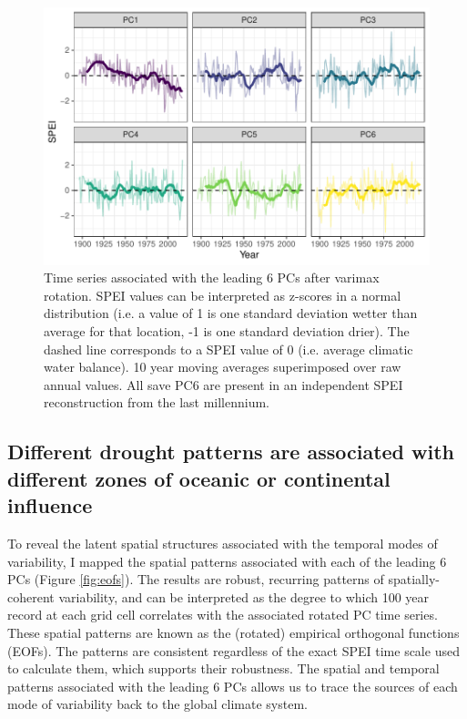 \documentclass[10pt]{iopart}
\begin{document}
\begin{figure}[!ht]
\centering
\includegraphics[width=.7\linewidth]{figures/pc_obs.pdf}
\caption{Time series associated with the leading 6 PCs after varimax rotation. SPEI values can be interpreted as z-scores in a normal distribution (i.e. a value of 1 is one standard deviation wetter than average for that location, -1 is one standard deviation drier). The dashed line corresponds to a SPEI value of 0 (i.e. average climatic water balance). 10 year moving averages superimposed over raw annual values. All save PC6 are present in an independent SPEI reconstruction from the last millennium.}
\label{fig:pc-obs}
\end{figure}

\subsection*{Different drought patterns are associated with different zones of oceanic or continental influence}
To reveal the latent spatial structures associated with the temporal modes of variability, I mapped the spatial patterns associated with each of the leading 6 PCs (Figure \ref{fig:eofs}). The results are robust, recurring patterns of spatially-coherent variability, and can be interpreted as the degree to which 100 year record at each grid cell correlates with the associated rotated PC time series. These spatial patterns are known as the (rotated) empirical orthogonal functions (EOFs). The patterns are consistent regardless of the exact SPEI time scale used to calculate them, which supports their robustness. The spatial and temporal patterns associated with the leading 6 PCs allows us to trace the sources of each mode of variability back to the global climate system.
\end{document}
